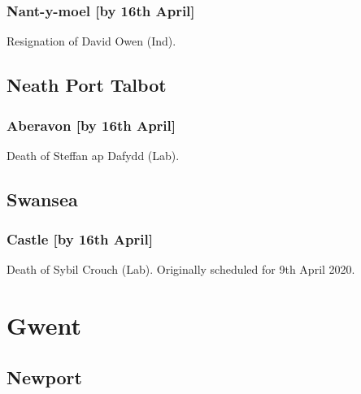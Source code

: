 \documentclass[a4paper,openany]{book}
\begin{document}
\begin{resultsiii}
\subsubsection*{Nant-y-moel \hspace*{\fill}\nolinebreak[1]%
	\enspace\hspace*{\fill}
	[by 16th April]}


Resignation of David Owen (Ind).

\subsection*{Neath Port Talbot}

\subsubsection*{Aberavon \hspace*{\fill}\nolinebreak[1]%
	\enspace\hspace*{\fill}
	[by 16th April]}


Death of Steffan ap Dafydd (Lab).

\subsection*{Swansea}

\subsubsection*{Castle \hspace*{\fill}\nolinebreak[1]%
	\enspace\hspace*{\fill}
	[by 16th April]}


Death of Sybil Crouch (Lab).  Originally scheduled for 9th April 2020.

\section{Gwent}

\subsection*{Newport}


\end{resultsiii}
\end{document}
